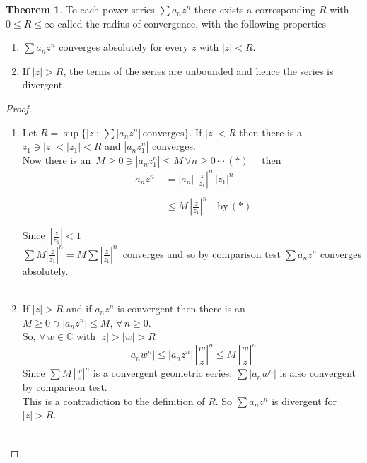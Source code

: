 \documentclass[11pt,a4paper]{article}
\theoremstyle{definition}
\newtheorem{thm}{Theorem}[section]
\begin{document}
\begin{thm}
To each power series $\displaystyle{\sum a_n z^n}$ there exists a corresponding $R$ with $0\leq R\leq \infty$ called the radius of convergence, with the following properties
\begin{enumerate}
\item[i).] $\displaystyle{\sum a_n z^n}$ converges absolutely for every $z$ with $\left|z\right| < R$.
\item[ii).] If $\left|z\right|> R$, the terms of the series are unbounded and hence the series is divergent.\\
\end{enumerate}
\end{thm}

\begin{proof}
\begin{enumerate}
\item[i).] Let $R = \sup \big\{\left|z\right|:\, \sum \left|a_n z^n\right|\, \text{converges}\big\}$. If $\left|z\right| < R$ then there is a $z_1\ni \left|z\right| < \left|z_1\right| < R$ and $\displaystyle{\left|a_nz_1^n\right|}$ converges.\\
Now there is an $\,M\geq 0 \ni \left|a_nz_1^n\right|\leq M \, \forall n \geq 0\, \cdots\,(*) \quad $ then 
\begin{align*}
\left|a_nz^n\right| & = \left|a_n\right|\,\left|\frac{z}{z_1}\right|^n\,\left|z_1\right|^n\\\\
& \leq M\,\left|\frac{z}{z_1}\right|^n\quad  \text{by}\,(*)
\end{align*}

Since $\,\displaystyle{\left|\frac{z}{z_1}\right| < 1}$\\

$\displaystyle{\sum M \left|\frac{z}{z_1}\right|^n = M \sum \left|\frac{z}{z_1}\right|^n}\,$ converges and so by comparison test $\displaystyle{\sum a_n z^n}$ converges absolutely.\\\\


\item[ii).] If $\left|z\right|>R$ and if $\displaystyle{a_nz^n}$ is convergent then there is an $M\geq 0 \ni \left|a_n z^n\right| \leq M,\, \forall\, n\geq 0$.\\
So, $\forall\, w \in \mathbb{C}$ with $\left|z\right| > \left|w\right| >R$
$$\left|a_nw^n\right| \leq \left|a_nz^n\right|\,\left|\frac{w}{z}\right|^n \leq M\,\left|\frac{w}{z}\right|^n$$
Since $\displaystyle{\sum M\,\left|\frac{w}{z}\right|^n}$ is a convergent geometric series. $\displaystyle{\sum \left|a_nw^n\right|}$ is also convergent by comparison test.\\
This is a contradiction to the definition of $R$. So $\displaystyle{\sum a_n z^n}$ is divergent for $\left|z\right|> R$.\\\\
\end{enumerate}





\end{proof}
\end{document}

